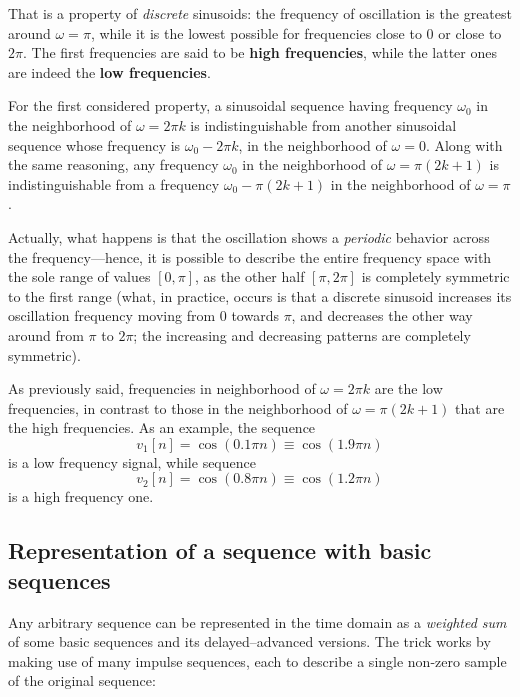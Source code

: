 \documentclass[\documentfontsize, twocolumn]{\classname}
\begin{document}
That is a property of \emph{discrete} sinusoids: the frequency of oscillation is the greatest around $\omega=\pi$, while it is the lowest possible for frequencies close to $0$ or close to $2\pi$. The first frequencies are said to be \textbf{high frequencies}, while the latter ones are indeed the \textbf{low frequencies}.

For the first considered property, a sinusoidal se\-quen\-ce having frequency $\omega_0$ in the neighborhood of $\omega=2\pi k$ is indistinguishable from another sinusoidal se\-quen\-ce whose frequency is $\omega_0 - 2 \pi k$, in the neighborhood of $\omega = 0$. Along with the same reasoning, any frequency $\omega_0$ in the neighborhood of $\omega = \pi (2k + 1)$ is indistinguishable from a frequency $\omega_0 - \pi(2k + 1)$ in the neighborhood of $\omega = \pi$.

Actually, what happens is that the oscillation shows a \emph{periodic} behavior across the frequency---hence, it is possible to describe the entire frequency space with the sole range of values $[0, \pi]$, as the other half $[\pi, 2\pi]$ is completely symmetric to the first range (what, in practice, occurs is that a discrete sinusoid increases its oscillation frequency moving from $0$ towards $\pi$, and decreases the other way around from $\pi$ to $2\pi$; the increasing and decreasing patterns are completely symmetric).

As previously said, frequencies in neighborhood of $\omega = 2 \pi k$ are the low frequencies, in contrast to those in the neighborhood of $\omega = \pi (2k + 1)$ that are the high frequencies. As an example, the se\-quen\-ce 
\[
    v_1[n] = \cos{(0.1 \pi n)} \equiv \cos{(1.9\pi n)}
\] 
is a low frequency signal, while se\-quen\-ce 
\[
    v_2[n] = \cos{(0.8 \pi n)} \equiv \cos{(1.2\pi n)}
\] 
is a high frequency one. 

\subsection{Representation of a se\-quen\-ce with basic se\-quen\-ces}

Any arbitrary se\-quen\-ce can be represented in the time domain as a \emph{weighted sum} of some basic se\-quen\-ces and its delayed--advanced versions. The trick works by making use of many impulse sequences, each to describe a single non-zero sample of the original sequence:
\end{document}
